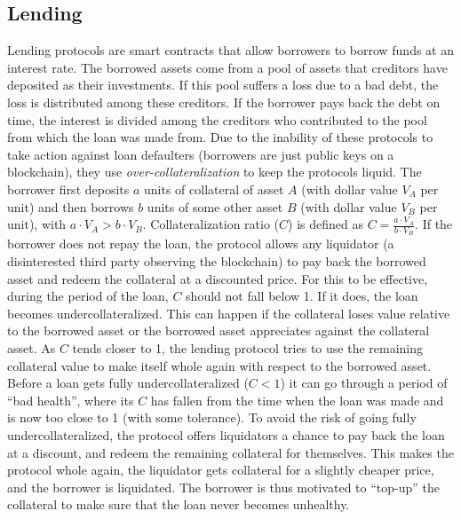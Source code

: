 \subsection{Lending}
Lending protocols are smart contracts that allow borrowers to borrow funds at an interest rate. The borrowed assets come from a pool of assets that creditors have deposited as their investments. If this pool suffers a loss due to a bad debt, the loss is distributed among these creditors. If the borrower pays back the debt on time, the interest is divided among the creditors who contributed to the pool from which the loan was made from. Due to the inability of these protocols to take action against loan defaulters (borrowers are just public keys on a blockchain), they use \textit{over-collateralization} to keep the protocols liquid. The borrower first deposits $a$ units of collateral of asset $A$ (with dollar value $V_A$ per unit) and then borrows $b$ units of some other asset $B$ (with dollar value $V_B$ per unit), with $a\cdot V_A > b\cdot V_B$. Collateralization ratio ($C$) is defined as $C = \frac{a\cdot V_A}{b\cdot V_B}$. If the borrower does not repay the loan, the protocol allows any liquidator (a disinterested third party observing the blockchain) to pay back the borrowed asset and redeem the collateral at a discounted price. For this to be effective, during the period of the loan, $C$ should not fall below 1. If it does, the loan becomes undercollateralized. This can happen if the collateral loses value relative to the borrowed asset or the borrowed asset appreciates against the collateral asset. As $C$ tends closer to 1, the lending protocol tries to use the remaining collateral value to make itself whole again with respect to the borrowed asset. Before a loan gets fully undercollateralized ($C < 1$) it can go through a period of ``bad health'', where its $C$ has fallen from the time when the loan was made and is now too close to 1 (with some tolerance). To avoid the risk of going fully undercollateralized, the protocol offers liquidators a chance to pay back the loan at a discount, and redeem the remaining collateral for themselves. This makes the protocol whole again, the liquidator gets collateral for a slightly cheaper price, and the borrower is liquidated. The borrower is thus motivated to ``top-up'' the collateral to make sure that the loan never becomes unhealthy.

